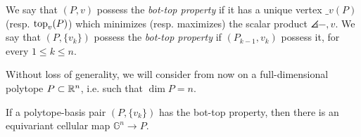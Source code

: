 \begin{definition}
    We say that $(P,v)$ possess the \emph{bot-top property} if it has a unique vertex $\bm_v(P)$ (resp. $\operatorname{top}_v(P)$) which minimizes (resp. maximizes) the scalar product $\angles{-,v}$.
    We say that $(P,\{v_k\})$ possess the \emph{bot-top property} if $(P_{k-1}, v_k)$ possess it, for every $1\leq k \leq n$.
\end{definition}

Without loss of generality, we will consider from now on a full-dimensional polytope $P\subset \mathbb{R}^n$, i.e. such that $\dim P=n$. 

\begin{proposition}
    If a polytope-basis pair $(P,\{v_k\})$ has the bot-top property, then there is an equivariant cellular map $\mathbb{G}^n \to P$.
\end{proposition}

